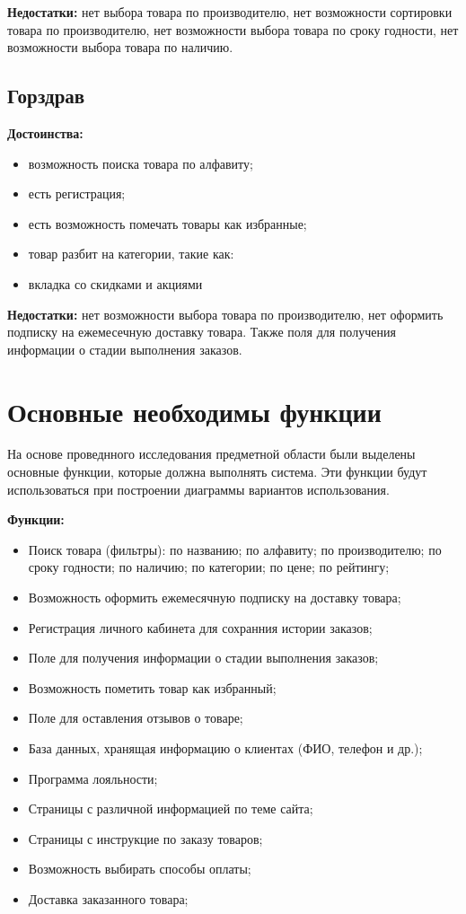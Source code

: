 \textbf{Недостатки:} нет выбора товара по производителю,
нет возможности сортировки товара по производителю,
нет возможности выбора товара по сроку годности,
нет возможности выбора товара по наличию.

\subsection{Горздрав}
\textbf{Достоинства:}\par
\begin{itemize}
	\item возможность поиска товара по алфавиту;
	\item есть регистрация;
	\item есть возможность помечать товары как избранные;
	\item товар разбит на категории, такие как:
	\item вкладка со скидками и акциями
\end{itemize}

\textbf{Недостатки:} нет возможности выбора товара по производителю,
нет оформить подписку на ежемесечную доставку товара. Также поля для получения информации о стадии выполнения заказов.

\section{Основные необходимы функции}
На основе проведнного исследования предметной области были выделены основные
функции, которые должна выполнять система. Эти функции будут использоваться
при построении диаграммы вариантов использования.

\textbf{Функции:}
\begin{itemize}
	\item Поиск товара (фильтры): по названию; по алфавиту; по производителю;
		по сроку годности; по наличию; по категории; по цене; по рейтингу;
	\item Возможность оформить ежемесячную подписку на доставку товара;
	\item Регистрация личного кабинета для сохранния истории заказов;
	\item Поле для получения информации о стадии выполнения заказов;
	\item Возможность пометить товар как избранный;
	\item Поле для оставления отзывов о товаре;
	\item База данных, хранящая информацию о клиентах (ФИО, телефон и др.);
	\item Программа лояльности;
	\item Страницы с различной информацией по теме сайта;
	\item Страницы с инструкцие по заказу товаров;
	\item Возможность выбирать способы оплаты;
	\item Доставка заказанного товара;
\end{itemize}

